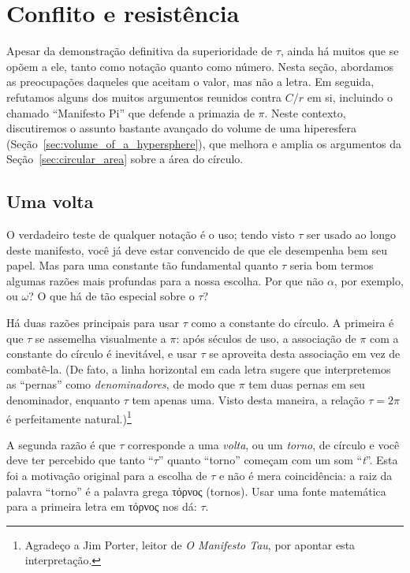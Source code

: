 

\section{Conflito e resistência} %
\label{sec:conflict_and_resistance}

Apesar da demonstração definitiva da superioridade de $\tau$, ainda há muitos que se opõem a ele, tanto como notação quanto como número. Nesta seção, abordamos as preocupações daqueles que aceitam o valor, mas não a letra. Em seguida, refutamos alguns dos muitos argumentos reunidos contra $C/r$ em si, incluindo o chamado ``Manifesto Pi'' que defende a primazia de $\pi$. Neste contexto, discutiremos o assunto bastante avançado do volume de uma hiperesfera (Seção~\ref{sec:volume_of_a_hypersphere}), que melhora e amplia os argumentos da Seção~\ref{sec:circular_area} sobre a área do círculo.

  \subsection{Uma volta} %
  \label{sec:one_turn}

O verdadeiro teste de qualquer notação é o uso; tendo visto $\tau$ ser usado ao longo deste manifesto, você já deve estar convencido de que ele desempenha bem seu papel. Mas para uma constante tão fundamental quanto $\tau$ seria bom termos algumas razões mais profundas para a nossa escolha. Por que não $\alpha$, por exemplo, ou $\omega$? O que há de tão especial sobre o $\tau$?

Há duas razões principais para usar $\tau$ como a constante do círculo. A primeira é que $\tau$ se assemelha visualmente a $\pi$: após séculos de uso, a associação de $\pi$ com a constante do círculo é inevitável, e usar $\tau$ se aproveita desta associação em vez de combatê-la. (De fato, a linha horizontal em cada letra sugere que interpretemos as ``pernas'' como \emph{denominadores}, de modo que $\pi$ tem duas pernas em seu denominador, enquanto $\tau$ tem apenas uma. Visto desta maneira, a relação $\tau = 2\pi$ é perfeitamente natural.)\footnote{Agradeço a Jim Porter, leitor de \emph{O Manifesto Tau}, por apontar esta interpretação.}

A segunda razão é que $\tau$ corresponde a uma \emph{volta}, ou um \emph{torno}, de círculo e você deve ter percebido que tanto ``$\tau$'' quanto ``torno'' começam com um som ``\emph{t}''. Esta foi a motivação original para a escolha de $\tau$ e não é mera coincidência: a raiz da palavra ``torno'' é a palavra grega τόρνος (tornos). Usar uma fonte matemática para a primeira letra em τόρνος nos dá: $\tau$.

